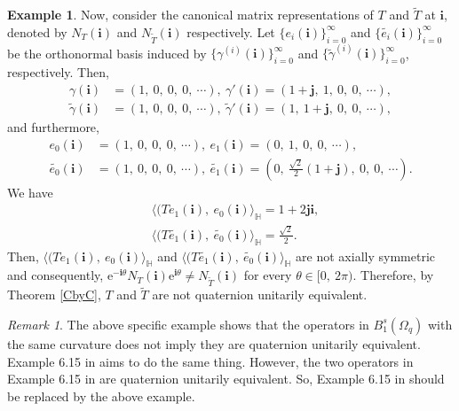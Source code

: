 \documentclass[pdflatex,sn-mathphys-num]{sn-jnl}%
\theoremstyle{thmstyleone}%
\theoremstyle{thmstyletwo}%
\newtheorem{example}{Example}%
\newtheorem{remark}{Remark}%
\theoremstyle{thmstylethree}%
\theoremstyle{definition}
\newtheorem{example}[theorem]{Example}
\theoremstyle{remark}
\newtheorem{remark}[theorem]{Remark}
\begin{document}
\begin{example}
    Now, consider the canonical matrix representations of $T$ and $\widetilde{T}$ at $\boldsymbol{i}$, denoted by $N_T(\boldsymbol{i})$ and $N_{\widetilde{T}}(\boldsymbol{i})$ respectively.
    Let $\{e_i(\boldsymbol{i})\}_{i=0}^{\infty}$ and $\{\widetilde{e_i}(\boldsymbol{i})\}_{i=0}^{\infty}$ be the orthonormal basis induced by $\{\gamma^{(i)}(\boldsymbol{i})\}_{i=0}^{\infty}$ and $\{\widetilde{\gamma}^{(i)}(\boldsymbol{i})\}_{i=0}^{\infty}$, respectively.
    Then,
    $$\begin{aligned}
    \gamma(\boldsymbol{i}) & =(1,\ 0,\ 0,\ 0,\ \cdots),\ \gamma'(\boldsymbol{i}) =(1+\boldsymbol{j},\ 1, \ 0,\ 0,\ \cdots), \\
    \widetilde{\gamma}(\boldsymbol{i}) & =(1,\ 0,\ 0,\ 0,\ \cdots),\ \widetilde{\gamma}'(\boldsymbol{i}) =(1,\ 1+\boldsymbol{j}, \ 0,\ 0,\ \cdots),
    \end{aligned}$$
    and furthermore,
     $$\begin{aligned}
    	e_0(\boldsymbol{i}) & =(1,\ 0,\ 0,\ 0,\ \cdots),\ e_1(\boldsymbol{i}) =(0,\ 1, \ 0,\ 0,\ \cdots), \\
    	\widetilde{e_0}(\boldsymbol{i}) & =(1,\ 0,\ 0,\ 0,\ \cdots),\ \widetilde{e_1}(\boldsymbol{i}) =(0,\ \frac{\sqrt{2}}{2}(1+\boldsymbol{j}), \ 0,\ 0,\ \cdots).
    \end{aligned}$$
    We have
     $$\begin{aligned}
     &\langle(Te_1(\boldsymbol{i}),\ e_0(\boldsymbol{i}) \rangle_{\mathbb{H}}=1+2\boldsymbol{ji}, \\
     & \langle(T\widetilde{e_1}(\boldsymbol{i}),\ \widetilde{e_0}(\boldsymbol{i}) \rangle_{\mathbb{H}}=\frac{\sqrt{2}}{2}.
    \end{aligned}$$
    Then, $\langle(Te_1(\boldsymbol{i}),\ e_0(\boldsymbol{i}) \rangle_{\mathbb{H}}$ and $\langle(T\widetilde{e_1}(\boldsymbol{i}),\ \widetilde{e_0}(\boldsymbol{i}) \rangle_{\mathbb{H}}$ are not axially symmetric and consequently, $\mathrm{e}^{-\boldsymbol{i}\theta}N_{T}(\boldsymbol{i})\mathrm{e}^{\boldsymbol{i}\theta}\ne N_{\widetilde{T}}(\boldsymbol{i})$ for every $\theta\in[0,\ 2\pi)$. Therefore, by Theorem \ref{CbyC},
    $T$ and $\widetilde{T}$ are not quaternion unitarily equivalent.
\end{example}

\begin{remark}
	The above specific example shows that the operators in $B_1^{s}(\Omega_{q})$ with the same curvature does not imply they are quaternion unitarily equivalent.
	Example {6.15} in \cite{HT} aims to do the same thing. However, the two operators in Example {6.15} in \cite{HT} are quaternion unitarily equivalent. So, Example {6.15} in \cite{HT} should be replaced by the above example.
\end{remark}
\end{document}
